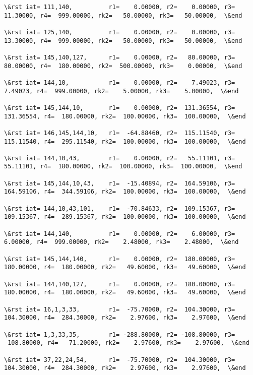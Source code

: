 \documentclass[11pt]{article}
\begin{document}
\begin{Verbatim}[commandchars=\\\{\}]
\&rst iat= 111,140,          r1=    0.00000, r2=    0.00000, r3=   11.30000, r4=  999.00000, rk2=   50.00000, rk3=   50.00000,  \&end

\&rst iat= 125,140,          r1=    0.00000, r2=    0.00000, r3=   13.30000, r4=  999.00000, rk2=   50.00000, rk3=   50.00000,  \&end

\&rst iat= 145,140,127,      r1=    0.00000, r2=   80.00000, r3=   80.00000, r4=  180.00000, rk2=  500.00000, rk3=    0.00000,  \&end

\&rst iat= 144,10,           r1=    0.00000, r2=    7.49023, r3=    7.49023, r4=  999.00000, rk2=    5.00000, rk3=    5.00000,  \&end

\&rst iat= 145,144,10,       r1=    0.00000, r2=  131.36554, r3=  131.36554, r4=  180.00000, rk2=  100.00000, rk3=  100.00000,  \&end

\&rst iat= 146,145,144,10,   r1=  -64.88460, r2=  115.11540, r3=  115.11540, r4=  295.11540, rk2=  100.00000, rk3=  100.00000,  \&end

\&rst iat= 144,10,43,        r1=    0.00000, r2=   55.11101, r3=   55.11101, r4=  180.00000, rk2=  100.00000, rk3=  100.00000,  \&end

\&rst iat= 145,144,10,43,    r1=  -15.40894, r2=  164.59106, r3=  164.59106, r4=  344.59106, rk2=  100.00000, rk3=  100.00000,  \&end

\&rst iat= 144,10,43,101,    r1=  -70.84633, r2=  109.15367, r3=  109.15367, r4=  289.15367, rk2=  100.00000, rk3=  100.00000,  \&end

\&rst iat= 144,140,          r1=    0.00000, r2=    6.00000, r3=    6.00000, r4=  999.00000, rk2=    2.48000, rk3=    2.48000,  \&end

\&rst iat= 145,144,140,      r1=    0.00000, r2=  180.00000, r3=  180.00000, r4=  180.00000, rk2=   49.60000, rk3=   49.60000,  \&end

\&rst iat= 144,140,127,      r1=    0.00000, r2=  180.00000, r3=  180.00000, r4=  180.00000, rk2=   49.60000, rk3=   49.60000,  \&end

\&rst iat= 16,1,3,33,        r1=  -75.70000, r2=  104.30000, r3=  104.30000, r4=  284.30000, rk2=    2.97600, rk3=    2.97600,  \&end

\&rst iat= 1,3,33,35,        r1= -288.80000, r2= -108.80000, r3= -108.80000, r4=   71.20000, rk2=    2.97600, rk3=    2.97600,  \&end

\&rst iat= 37,22,24,54,      r1=  -75.70000, r2=  104.30000, r3=  104.30000, r4=  284.30000, rk2=    2.97600, rk3=    2.97600,  \&end


\end{Verbatim}
\end{document}
